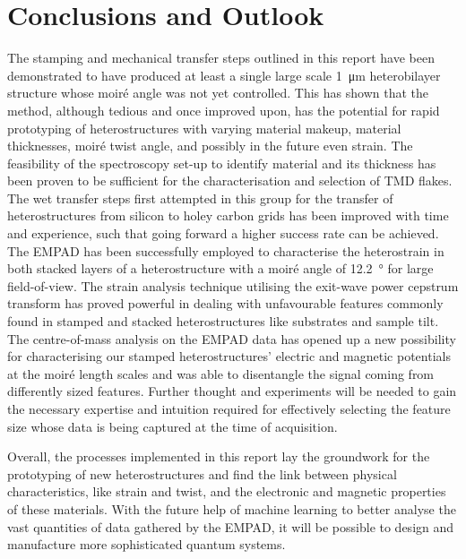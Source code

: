\section{Conclusions and Outlook}
The stamping and mechanical transfer steps outlined in this report have been demonstrated to have produced at least a single large scale \SI{1}{\micro\meter} heterobilayer structure whose moiré angle was not yet controlled. This has shown that the method, although tedious and once improved upon, has the potential for rapid prototyping of heterostructures with varying material makeup, material thicknesses, moiré twist angle, and possibly in the future even strain. The feasibility of the spectroscopy set-up to identify material and its thickness has been proven to be sufficient for the characterisation and selection of TMD flakes. The wet transfer steps first attempted in this group for the transfer of heterostructures from silicon to holey carbon grids has been improved with time and experience, such that going forward a higher success rate can be achieved.\\
The EMPAD has been successfully employed to characterise the heterostrain in both stacked layers of a heterostructure with a moiré angle of \SI{12.2}{\degree} for large field-of-view. The strain analysis technique utilising the exit-wave power cepstrum transform has proved powerful in dealing with unfavourable features commonly found in stamped and stacked heterostructures like substrates and sample tilt. The centre-of-mass analysis on the EMPAD data has opened up a new possibility for characterising our stamped heterostructures' electric and magnetic potentials at the moiré length scales and was able to disentangle the signal coming from differently sized features. Further thought and experiments will be needed to gain the necessary expertise and intuition required for effectively selecting the feature size whose data is being captured at the time of acquisition.

Overall, the processes implemented in this report lay the groundwork for the prototyping of new heterostructures and find the link between physical characteristics, like strain and twist, and the electronic and magnetic properties of these materials. With the future help of machine learning to better analyse the vast quantities of data gathered by the EMPAD, it will be possible to design and manufacture more sophisticated quantum systems.
